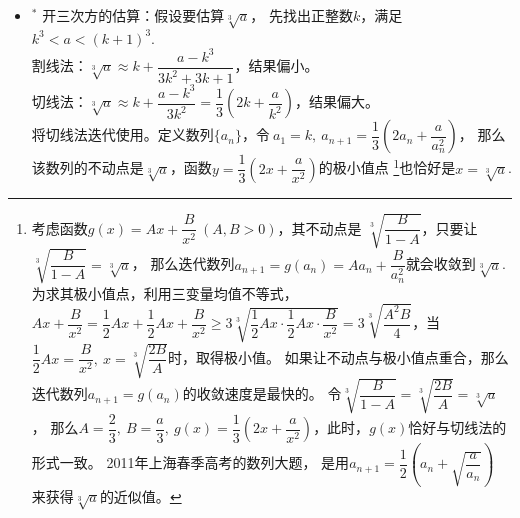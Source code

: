 \begin{itemize}[leftmargin=\inteval{\myitemleftmargin}pt,itemsep=
   \inteval{\myitemitempsep}pt,topsep=\inteval{\myitemtopsep}pt]
\begin{align*}
\end{align*}
实际上，数列$ a_n $的通项公式是可以计算出来的，
见本书第\ref{sec数列}章的(\ref{根式迭代序列的通项})式。 \\
\\  %
\noindent \item $^*$ 开三次方的估算：假设要估算$ \sqrt[3]{a} $，
先找出正整数$ k $，满足$ k^3<a<(k+1)^3 $. \\
割线法：$ \sqrt[3]{a}\approx k+\dfrac{a-k^3}{3k^2+3k+1} $，结果偏小。 	\\
切线法：$ \sqrt[3]{a}\approx k+\dfrac{a-k^3}{3k^2}=\dfrac{1}{3}\left(2k+\dfrac{a}{k^2}\right) $，结果偏大。\\
将切线法迭代使用。定义数列$ \{a_n\} $，令$\ a_1=k,\ a_{n+1}=\dfrac{1}{3}\left(2a_n+\dfrac{a}{a_n^2}\right) $，
那么该数列的不动点是$ \sqrt[3]{a} $，函数$ y=\dfrac{1}{3}\left(2x+\dfrac{a}{x^2}\right) $的极小值点
\footnote{考虑函数$ g(x)=Ax+\dfrac{B}{x^2}\ (A,B>0) $，其不动点是
$ \sqrt[3]{\dfrac{B}{1-A}} $，只要让$ \sqrt[3]{\dfrac{B}{1-A}}=\sqrt[3]{a} $，
那么迭代数列$ a_{n+1}=g(a_n)=Aa_n+\dfrac{B}{a_n^2} $就会收敛到$ \sqrt[3]{a} $.
为求其极小值点，利用三变量均值不等式，
$ Ax+\dfrac{B}{x^2}=\dfrac{1}{2}Ax+\dfrac{1}{2}Ax+\dfrac{B}{x^2}\geq 
3\sqrt[3]{\dfrac{1}{2}Ax\cdot\dfrac{1}{2}Ax\cdot\dfrac{B}{x^2}}=3\sqrt[3]{
    \dfrac{A^2B}{4}} $，当$ \dfrac{1}{2}Ax=\dfrac{B}{x^2},\ x=\sqrt[3]{
    \dfrac{2B}{A}} $时，取得极小值。
如果让不动点与极小值点重合，那么迭代数列$ a_{n+1}=g(a_n) $的收敛速度是最快的。
令$ \sqrt[3]{\dfrac{B}{1-A}}=\sqrt[3]{\dfrac{2B}{A}}=\sqrt[3]{a} $，
那么$ A=\dfrac{2}{3},\ B=\dfrac{a}{3},\ g(x)=\dfrac{1}{3}\left(
2x+\dfrac{a}{x^2}\right) $，此时，$ g(x) $恰好与切线法的形式一致。
2011年上海春季高考的数列大题，
是用$ a_{n+1}=\dfrac{1}{2}\left(a_n+\sqrt{\dfrac{a}{a_n}}\right) $
来获得$ \sqrt[3]{a} $的近似值。}也恰好是$ x=\sqrt[3]{a} $.
    


\end{itemize}

